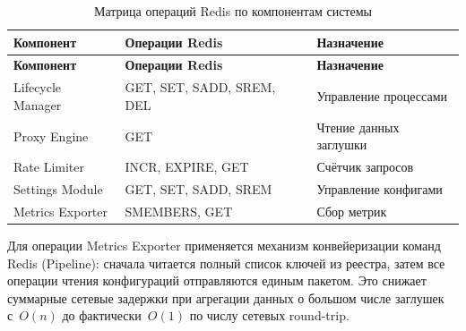 \begin{xltabular}{\textwidth}{|l|X|l|}
\caption{Матрица операций Redis по компонентам системы} \label{tab:redis-ops} \\
\hline
\textbf{Компонент} & \textbf{Операции Redis} & \textbf{Назначение} \\ \hline
\endfirsthead
\hline
\textbf{Компонент} & \textbf{Операции Redis} & \textbf{Назначение} \\ \hline
\endhead

Lifecycle Manager & GET, SET, SADD, SREM, DEL & Управление процессами \\ \hline
Proxy Engine & GET & Чтение данных заглушки \\ \hline
Rate Limiter & INCR, EXPIRE, GET & Счётчик запросов \\ \hline
Settings Module & GET, SET, SADD, SREM & Управление конфигами \\ \hline
Metrics Exporter & SMEMBERS, GET & Сбор метрик \\ \hline
\end{xltabular}

Для операции Metrics Exporter применяется механизм конвейеризации команд Redis (Pipeline): сначала читается полный список ключей из реестра, затем все операции чтения конфигураций отправляются единым пакетом. Это снижает суммарные сетевые задержки при агрегации данных о большом числе заглушек с~$O(n)$ до фактически~$O(1)$ по числу сетевых round-trip.





